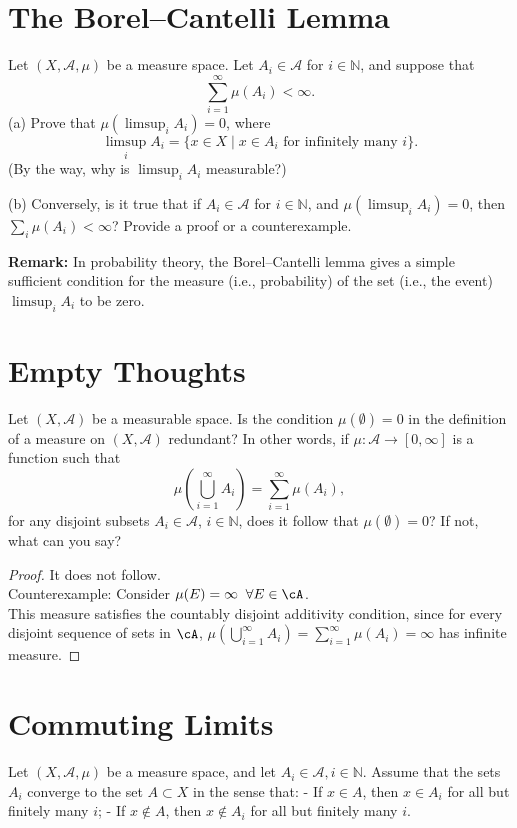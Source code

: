 \documentclass[lang=cn,11pt]{elegantbook}
\begin{document}
\section{The Borel--Cantelli Lemma}
Let \((X, \mathcal{A}, \mu)\) be a measure space. Let \(A_i \in \mathcal{A}\) for \(i \in \mathbb{N}\), and suppose that
\[
\sum_{i=1}^\infty \mu(A_i) < \infty.
\]
(a) Prove that \(\mu(\limsup_i A_i) = 0\), where
\[
\limsup_i A_i = \{x \in X \mid x \in A_i \text{ for infinitely many } i\}.
\]
(By the way, why is \(\limsup_i A_i\) measurable?)

(b) Conversely, is it true that if \(A_i \in \mathcal{A}\) for \(i \in \mathbb{N}\), and \(\mu(\limsup_i A_i) = 0\), then \(\sum_i \mu(A_i) < \infty\)? Provide a proof or a counterexample.

\textbf{Remark:} In probability theory, the Borel–Cantelli lemma gives a simple sufficient condition for the measure (i.e., probability) of the set (i.e., the event) \(\limsup_i A_i\) to be zero.

\section{Empty Thoughts}
Let \((X, \mathcal{A})\) be a measurable space. Is the condition \(\mu(\emptyset) = 0\) in the definition of a measure on \((X, \mathcal{A})\) redundant? In other words, if \(\mu : \mathcal{A} \to [0, \infty]\) is a function such that
\[
\mu\left(\bigcup_{i=1}^\infty A_i\right) = \sum_{i=1}^\infty \mu(A_i),
\]
for any disjoint subsets \(A_i \in \mathcal{A}\), \(i \in \mathbb{N}\), does it follow that \(\mu(\emptyset) = 0\)? If not, what can you say?
\begin{proof}
    It does not follow.\\
    Counterexample: Consider $\mu(E) = \infty \;\; \forall E \in \cA$.\\
    This measure satisfies the countably disjoint additivity condition, since for every disjoint sequence of sets in $\cA$, $\mu\left(\bigcup_{i=1}^\infty A_i\right) = \sum_{i=1}^\infty \mu(A_i) = \infty$ has infinite measure. 
\end{proof}


\section{Commuting Limits}
Let \((X, \mathcal{A}, \mu)\) be a measure space, and let \(A_i \in \mathcal{A}, i \in \mathbb{N}\). Assume that the sets \(A_i\) converge to the set \(A \subset X\) in the sense that:
- If \(x \in A\), then \(x \in A_i\) for all but finitely many \(i\);
- If \(x \notin A\), then \(x \notin A_i\) for all but finitely many \(i\).
\end{document}
